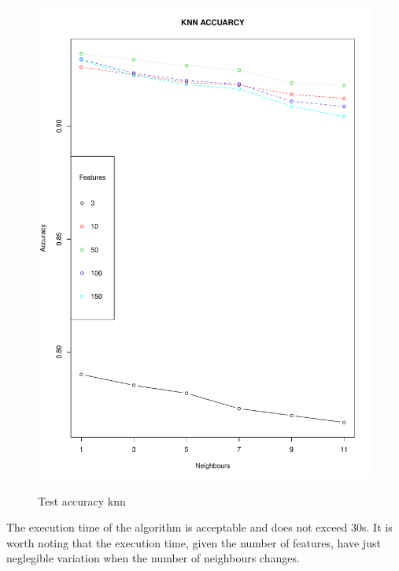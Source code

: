 \documentclass{article}
\begin{document}
\begin{figure}[H]
\begin{adjustwidth}{-4cm}{-4cm}
{    \includegraphics[scale=0.35]{../knn_accuracy_rgb.pdf}  
     }
     \centering
     \caption{Test accuracy knn}
      \end{adjustwidth}
   \end{figure}
   
\noindent The execution time of the algorithm is acceptable and does not exceed 30s. It is worth noting that the execution time, given the number of features, have just neglegible variation when the number of neighbours changes.\\
\end{document}
